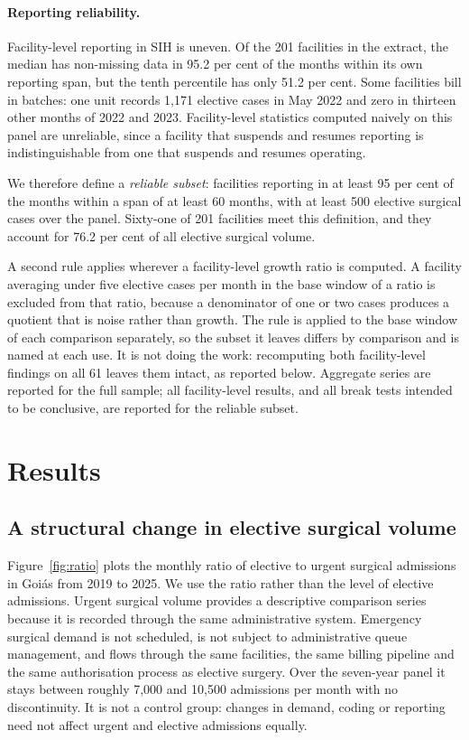 \paragraph{Reporting reliability.}
Facility-level reporting in SIH is uneven. Of the 201 facilities in the
extract, the median has non-missing data in 95.2 per cent of the months within
its own reporting span, but the tenth percentile has only 51.2 per cent. Some
facilities bill in batches: one unit records 1{,}171 elective cases in May 2022
and zero in thirteen other months of 2022 and 2023. Facility-level statistics
computed naively on this panel are unreliable, since a facility that suspends
and resumes reporting is indistinguishable from one that suspends and resumes
operating.

We therefore define a \emph{reliable subset}: facilities reporting in at least
95 per cent of the months within a span of at least 60 months, with at least
500 elective surgical cases over the panel. Sixty-one of 201 facilities meet
this definition, and they account for 76.2 per cent of all elective surgical
volume.

A second rule applies wherever a facility-level growth ratio is computed. A
facility averaging under five elective cases per month in the base window of a
ratio is excluded from that ratio, because a denominator of one or two cases
produces a quotient that is noise rather than growth. The rule is applied to the
base window of each comparison separately, so the subset it leaves differs by
comparison and is named at each use. It is not doing the work: recomputing both
facility-level findings on all 61 leaves them intact, as reported below. Aggregate series are reported for the full sample; all facility-level
results, and all break tests intended to be conclusive, are reported for the
reliable subset.


\section{Results}
\label{sec:results}

\subsection{A structural change in elective surgical volume}
\label{sec:breaks}

Figure~\ref{fig:ratio} plots the monthly ratio of elective to urgent surgical
admissions in Goi\'as from 2019 to 2025. We use the ratio rather than the level
of elective admissions. Urgent surgical volume provides a descriptive comparison series because it is recorded through the same administrative system. Emergency surgical demand is not scheduled, is not subject to
administrative queue management, and flows through the same facilities, the
same billing pipeline and the same authorisation process as elective surgery.
Over the seven-year panel it stays between roughly 7{,}000 and 10{,}500
admissions per month with no discontinuity. It is not a control group: changes in demand, coding or reporting need not affect urgent and elective admissions equally.

